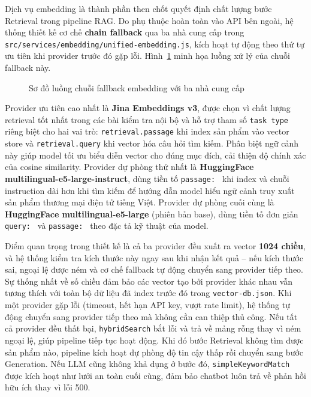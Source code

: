 \begin{sloppypar}
Dịch vụ embedding là thành phần then chốt quyết định chất lượng bước Retrieval trong pipeline RAG. Do phụ thuộc hoàn toàn vào API bên ngoài, hệ thống thiết kế cơ chế \textbf{chain fallback} qua ba nhà cung cấp trong \texttt{src/services/embedding/unified-embedding.js}, kích hoạt tự động theo thứ tự ưu tiên khi provider trước đó gặp lỗi. Hình~\ref{fig:embedding_fallback} minh họa luồng xử lý của chuỗi fallback này.

\begin{figure}[H]
  \centering
  \caption{Sơ đồ luồng chuỗi fallback embedding với ba nhà cung cấp}
  \label{fig:embedding_fallback}
\end{figure}

Provider ưu tiên cao nhất là \textbf{Jina Embeddings v3}, được chọn vì chất lượng retrieval tốt nhất trong các bài kiểm tra nội bộ và hỗ trợ tham số \texttt{task type} riêng biệt cho hai vai trò: \texttt{retrieval.passage} khi index sản phẩm vào vector store và \texttt{retrieval.query} khi vector hóa câu hỏi tìm kiếm. Phân biệt ngữ cảnh này giúp model tối ưu biểu diễn vector cho đúng mục đích, cải thiện độ chính xác của cosine similarity. Provider dự phòng thứ nhất là \textbf{HuggingFace multilingual-e5-large-instruct}, dùng tiền tố \texttt{passage: } khi index và chuỗi instruction dài hơn khi tìm kiếm để hướng dẫn model hiểu ngữ cảnh truy xuất sản phẩm thương mại điện tử tiếng Việt. Provider dự phòng cuối cùng là \textbf{HuggingFace multilingual-e5-large} (phiên bản base), dùng tiền tố đơn giản \texttt{query: } và \texttt{passage: } theo đặc tả kỹ thuật của model.

Điểm quan trọng trong thiết kế là cả ba provider đều xuất ra vector \textbf{1024 chiều}, và hệ thống kiểm tra kích thước này ngay sau khi nhận kết quả -- nếu kích thước sai, ngoại lệ được ném và cơ chế fallback tự động chuyển sang provider tiếp theo. Sự thống nhất về số chiều đảm bảo các vector tạo bởi provider khác nhau vẫn tương thích với toàn bộ dữ liệu đã index trước đó trong \texttt{vector-db.json}. Khi một provider gặp lỗi (timeout, hết hạn API key, vượt rate limit), hệ thống tự động chuyển sang provider tiếp theo mà không cần can thiệp thủ công. Nếu tất cả provider đều thất bại, \texttt{hybridSearch} bắt lỗi và trả về mảng rỗng thay vì ném ngoại lệ, giúp pipeline tiếp tục hoạt động. Khi đó bước Retrieval không tìm được sản phẩm nào, pipeline kích hoạt dự phòng độ tin cậy thấp rồi chuyển sang bước Generation. Nếu LLM cũng không khả dụng ở bước đó, \texttt{simpleKeywordMatch} được kích hoạt như lưới an toàn cuối cùng, đảm bảo chatbot luôn trả về phản hồi hữu ích thay vì lỗi 500.
\end{sloppypar}

